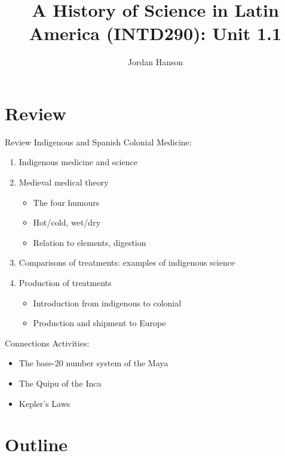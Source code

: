 \documentclass{beamer}
\title{A History of Science in Latin America (INTD290): Unit 1.1}
\author{Jordan Hanson}
\institute{Whittier College Department of Physics and Astronomy}
\begin{document}
\maketitle

\section{Review}

\begin{frame}{Review}
\alert{Indigenous and Spanish Colonial Medicine}:
\begin{enumerate}
\item Indigenous medicine and science
\item Medieval medical theory
\begin{itemize}
\item The four humours
\item Hot/cold, wet/dry
\item Relation to elements, digestion
\end{itemize}
\item Comparisons of treatments: examples of indigenous science
\item Production of treatments
\begin{itemize}
\item Introduction from indigenous to colonial
\item Production and shipment to Europe
\end{itemize}
\end{enumerate}
\alert{Connections Activities}:
\begin{itemize}
\item The base-20 number system of the Maya
\item The Quipu of the Inca
\item Kepler's Laws
\end{itemize}
\end{frame}

\section{Outline}
\end{document}
